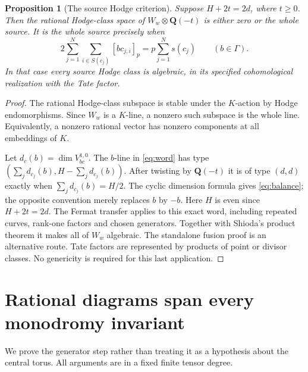 \documentclass[11pt]{article}
\newtheorem{proposition}[theorem]{Proposition}
\theoremstyle{definition}
\newcommand{\Q}{\mathbf Q}
\begin{document}
\begin{proposition}[The source Hodge criterion]\label{prop:balance}
Suppose $H+2t=2d$, where $t\geq0$. Then the rational Hodge-class space
of $W_w\otimes\Q(-t)$ is either zero or the whole source. It is the
whole source precisely when
\begin{equation}\label{eq:balance}
 2\sum_{j=1}^N\sum_{i\in S(c_j)}[b c_{j,i}]_p
       =p\sum_{j=1}^N s(c_j)\qquad(b\in\Gamma).
\end{equation}
In that case every source Hodge class is algebraic, in its specified
cohomological realization with the Tate factor.
\end{proposition}
\begin{proof}
The rational Hodge-class subspace is stable under the $K$-action by Hodge
endomorphisms. Since $W_w$ is a $K$-line, a nonzero such subspace is the
whole line. Equivalently, a nonzero rational vector has nonzero components
at all embeddings of $K$.

Let $d_c(b)=\dim V_{bc}^{1,0}$. The $b$-line in \eqref{eq:word} has
type $(\sum_jd_{c_j}(b),H-\sum_jd_{c_j}(b))$. After twisting by
$\Q(-t)$ it is of type $(d,d)$ exactly when
$\sum_jd_{c_j}(b)=H/2$. The cyclic dimension formula gives
\eqref{eq:balance}; the opposite convention merely replaces $b$ by $-b$.
Here $H$ is even since $H+2t=2d$. The Fermat transfer
\cite[Corollary~1.2]{Fermat} applies to this exact word, including repeated
curves, rank-one factors and chosen generators. Together with Shioda's
product theorem it makes all of $W_w$ algebraic. The standalone fusion
proof \cite[Theorem~1.1]{Fusion} is an alternative route.
Tate factors are represented by products of point or divisor
classes. No genericity is required for this last application.
\end{proof}

\section{Rational diagrams span every monodromy invariant}\label{sec:diagrams}
We prove the generator step rather than treating it as a hypothesis about
the central torus. All arguments are in a fixed finite tensor degree.
\end{document}
